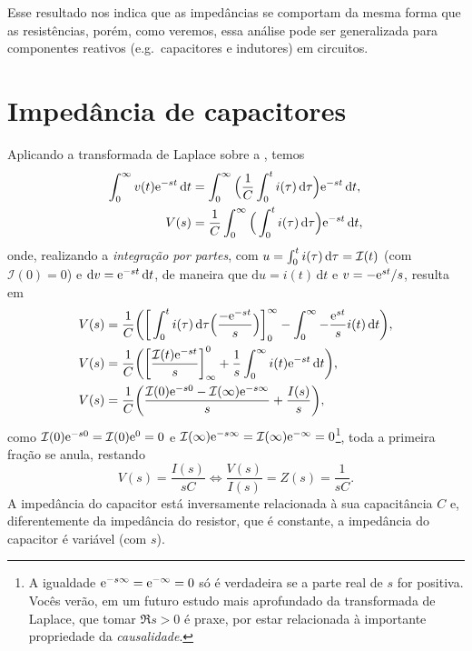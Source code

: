 Esse resultado nos indica que as impedâncias se comportam da mesma forma que as resistências, porém, como veremos, essa análise pode ser generalizada para componentes reativos (e.g.\ capacitores e indutores) em circuitos.

\section{Impedância de capacitores}
Aplicando a transformada de Laplace sobre a , temos
\begin{align*}
	\lt{v(t)}{t}&=\intd{\Big(\frac{1}{C}\intd{i(\tau)}{\tau}{0}{t}\Big)\e^{-st}}{t}{0}{\infty},\\
	V(s)&=\frac{1}{C}\intd{\Big(\intd{i(\tau)}{\tau}{0}{t}\Big)\e^{-st}}{t}{0}{\infty},
\end{align*}
onde, realizando a \emph{integração por partes}, com $u=\intd{i(\tau)}{\tau}{0}{t}=\mathcal{I}(t)$ (com $\mathcal{I}(0)=0$) e $\mathrm{d}v=\e^{-st}\,\mathrm{d}t$, de maneira que $\mathrm{d}u=i(t)\,\mathrm{d}t$ e $v=-\e^{st}/s$, resulta em
\begin{align*}
	V(s)&=\frac{1}{C}\bigg(\bigg[\intd{i(\tau)}{\tau}{0}{t}\Big(\frac{-\e^{-st}}{s}\Big)\bigg]_0^\infty-\intd{-\frac{\e^{st}}{s}i(t)}{t}{0}{\infty}\bigg),\\
	V(s)&=\frac{1}{C}\bigg(\bigg[\frac{\mathcal{I}(t)\e^{-st}}{s}\bigg]_\infty^0+\frac{1}{s}\lt{i(t)}{t}\bigg),\\
	V(s)&=\frac{1}{C}\bigg(\frac{\mathcal{I}(0)\e^{-s0}-\mathcal{I}(\infty)\e^{-s\infty}}{s}+\frac{I(s)}{s}\bigg),
\end{align*}
como $\mathcal{I}(0)\e^{-s0}=\mathcal{I}(0)\e^{0}=0$ e $\mathcal{I}(\infty)\e^{-s\infty}=\mathcal{I}(\infty)\e^{-\infty}=0$\footnote{A igualdade $\e^{-s\infty}=\e^{-\infty}=0$ só é verdadeira se a parte real de $s$ for positiva. Vocês verão, em um futuro estudo mais aprofundado da transformada de Laplace, que tomar $\Re s>0$ é praxe, por estar relacionada à importante propriedade da \emph{causalidade}.}, toda a primeira fração se anula, restando
\begin{equation}\label{eq:zC}
	V(s)=\frac{I(s)}{sC}\iff\frac{V(s)}{I(s)}=\boxed{Z(s)=\frac{1}{sC}.}
\end{equation}	
A impedância do capacitor está inversamente relacionada à sua capacitância $C$ e, diferentemente da impedância do resistor, que é constante, a impedância do capacitor é variável (com $s$).

